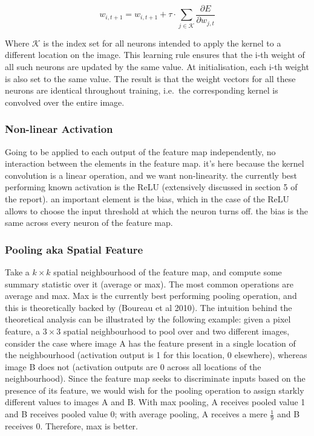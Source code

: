 \documentclass[a4paper,11pt]{article}
\begin{document}
\begin{equation}
 w_{i,t+1} = w_{i,t+1} + \tau \cdot \sum_{j \in \mathcal{K}}	\frac{\partial{E}}{\partial{w_{j,t}}}
\label{eqn:conv_learning_rule}
\end{equation}

Where $\mathcal{K}$ is the index set for all neurons intended to apply the kernel to a different location on the image. This learning rule ensures that the i-th weight of all such neurons are updated by the same value. At initialisation, each i-th weight is also set to the same value. The result is that the weight vectors for all these neurons are identical throughout training, i.e.\ the corresponding kernel is convolved over the entire image. \\
 
\subsubsection{Non-linear Activation}

Going to be applied to each output of the feature map independently, no interaction between the elements in the feature map. it's here because the kernel convolution is a linear operation, and we want non-linearity. the currently best performing known activation is the ReLU (extensively discussed in section 5 of the report). an important element is the bias, which in the case of the ReLU allows to choose the input threshold at which the neuron turns off. the bias is the same across every neuron of the feature map. \\

\subsubsection{Pooling aka Spatial Feature}

Take a $k \times k$ spatial neighbourhood of the feature map, and compute some summary statistic over it (average or max). The most common operations are average and max. Max is the currently best performing pooling operation, and this is theoretically backed by (Boureau et al 2010). The intuition behind the theoretical analysis can be illustrated by the following example: given a pixel feature, a $3 \times 3$ spatial neighbourhood to pool over and two different images, consider the case where image A has the feature present in a single location of the neighbourhood (activation output is 1 for this location, 0 elsewhere), whereas image B does not (activation outputs are 0 across all locations of the neighbourhood). Since the feature map seeks to discriminate inputs based on the presence of its feature, we would wish for the pooling operation to assign starkly different values to images A and B. With max pooling, A receives pooled value 1 and B receives pooled value 0; with average pooling, A receives a mere $\frac{1}{9}$ and B receives 0. Therefore, max is better. \\
\end{document}
